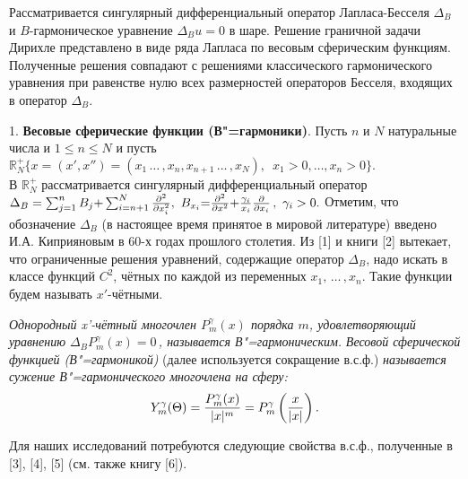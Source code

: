 \vzmscaption


Рассматривается сингулярный дифференциальный оператор Лапласа\--Бесселя $\Delta_B$ и $B$-гармоническое уравнение $\Delta_B u=0$ в шаре. Решение граничной задачи Дирихле представлено в виде ряда Лапласа по весовым сферическим функциям. Полученные решения совпадают с решениями классического гармонического уравнения при равенстве нулю всех размерностей операторов Бесселя, входящих в оператор $\Delta_B$.





  1. {\bf Весовые сферические функции (В"=гармоники)}.
Пусть $n$ и $N$ натуральные числа и $1{\le}n{\le}N$ и пусть\\
$\mathbb{R}^+_N \{x{=}(x',x'')
{=}(x_1\,\ldots\,,x_n,x_{n+1}\,\ldots\,,x_N),\,\,\, x_1{>}0,\ldots,x_n{>}0\}.$ \\
 В $\mathbb{R}_N^+$ рассматривается сингулярный
дифференциальный оператор
$\Delta_B=\sum_{j=1}^nB_j{+}\sum_{i=n+1}^N{\partial^2\over\partial x_i^2},
\,\, B_{x_i}{=}{{\partial^2}\over {\partial x^2}}{+}{\gamma_i\over {x_i}}
{\partial\over{\partial x_i}}\,,\,\, \gamma_i>0.$ Отметим, что обозначение $\Delta_B$ (в настоящее время принятое в мировой литературе) введено И.А. Киприяновым в 60-х годах прошлого столетия. Из [1] %
и книги [2]
вытекает, что ограниченные решения уравнений, содержащие оператор $\Delta_B$, надо искать в классе функций $C^2$, чётных по каждой из переменных $x_1,\,\ldots\,,x_n$. Такие функции будем называть $x'$-чётными.


{\it Однородный x'-чётный многочлен $P_m^\gamma(x)$ порядка $m$,  удовлетворяющий
уравнению $ \Delta_BP_m^\gamma(x)= 0$\,, называется В"=гармоничес\-ким.}
{\it Весовой сферической функцией (В"=гармоникой)} (далее используется сок\-ра\-ще\-ние в.с.ф.)
{\it называется сужение В"=гармонического многочлена на сферу:}
$$Y_m^\gamma(\Theta)={P_m^\gamma(x)\over|x|^m}= P_m^\gamma\left(x\over|x|
\right).$$

    Для наших исследований потребуются следующие свойства в.с.ф., полученные в [3], [4], [5]
 (см. также книгу [6]).

